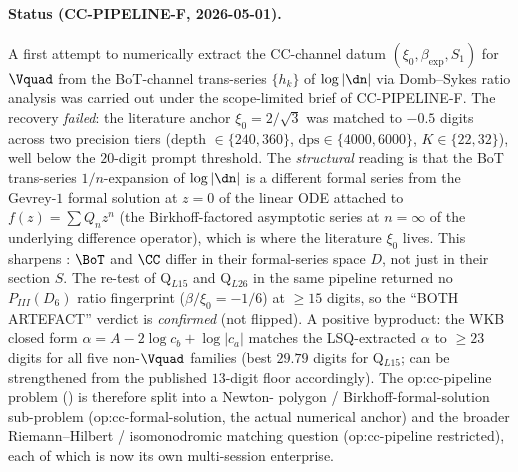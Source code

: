 %

\paragraph{Status (CC-PIPELINE-F, 2026-05-01).}
A first attempt to numerically extract the CC-channel datum
$(\xi_{0}, \beta_{\exp}, S_{1})$ for $\Vquad$ from the
BoT-channel trans-series $\{h_{k}\}$ of $\log|\dn|$ via
Domb--Sykes ratio analysis was carried out under the
scope-limited brief of CC-PIPELINE-F. The recovery
\emph{failed}: the literature anchor $\xi_{0} = 2/\sqrt{3}$
was matched to $-0.5$ digits across two precision tiers
(depth $\in \{240, 360\}$, $\mathrm{dps} \in \{4000, 6000\}$,
$K \in \{22, 32\}$), well below the $20$-digit prompt
threshold. The \emph{structural} reading is that the BoT
trans-series $1/n$-expansion of $\log|\dn|$ is a different
formal series from the Gevrey-$1$ formal solution at $z=0$
of the linear ODE attached to $f(z) = \sum Q_{n} z^{n}$ (the
Birkhoff-factored asymptotic series at $n=\infty$ of the
underlying difference operator), which is where the
literature $\xi_{0}$ lives. This sharpens
: $\BoT$ and $\CC$ differ in their
formal-series space $D$, not just in their section $S$. The
re-test of Q$_{L15}$ and Q$_{L26}$ in the same pipeline
returned no $P_{III}(D_{6})$ ratio fingerprint
($\beta/\xi_{0}=-1/6$) at $\geq 15$ digits, so the
\cite{siarc_borel_kscan} ``BOTH ARTEFACT'' verdict is
\emph{confirmed} (not flipped). A positive byproduct: the
WKB closed form $\alpha = A - 2\log c_{b} + \log|c_{a}|$
matches the LSQ-extracted $\alpha$ to $\geq 23$ digits for
all five non-$\Vquad$ families (best $29.79$ digits for
Q$_{L15}$;  can be strengthened from the
published $13$-digit floor accordingly). The op:cc-pipeline
problem () is therefore split into a Newton-
polygon / Birkhoff-formal-solution sub-problem
(\textsf{op:cc-formal-solution}, the actual numerical
anchor) and the broader Riemann--Hilbert / isomonodromic
matching question (\textsf{op:cc-pipeline} restricted), each
of which is now its own multi-session enterprise.
